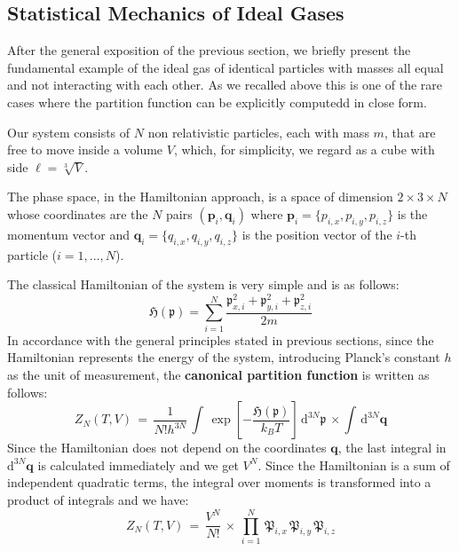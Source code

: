 \documentclass[10pt,a4paper]{article}
\begin{document}
\subsection{Statistical Mechanics of Ideal Gases}
\label{msidgas} After the general exposition of the previous section, we briefly present  the fundamental example
of the ideal gas of identical particles with masses all equal and not interacting with each other.  As we recalled above
this is one of the rare cases where the partition function can be explicitly computedd in close form.
\par
Our system consists of $N$  non relativistic particles,
each with mass $\mathit{m}$, that are free to move inside a
volume $V$, which, for simplicity,  we regard as a cube  with
side $\ell = \sqrt[3]{V}$.
\par The phase space, in the Hamiltonian approach, is a space of dimension $2\times 3 \times N$ whose coordinates are the
$N$ pairs $(\mathbf{p}_i,\mathbf{q}_i)$ where
$\mathbf{p}_i=\{p_{i,x},p_{i,y},p_{i,z}\}$ is the momentum vector
and $\mathbf{q}_i=\{q_{i,x},q_{i,y},q_{i,z}\}$ is the position vector
of the $i$-th particle ($i=1,\dots, N$).
\par
The classical Hamiltonian of the system is very simple and is as follows:
\begin{equation}\label{idgasham}
    \mathfrak{H}(\boldsymbol{\mathfrak{p}})= \sum _{i=1}^N
   \frac{\mathfrak{p}_{x,i}^2+\mathfrak{p}_{y,i}^2+\mathfrak{p}_{z,i}^2}{2 \mathit{m}}
\end{equation}
In accordance with the general principles stated in previous sections, since the Hamiltonian represents the
energy of the system, introducing Planck's constant $h$ as the unit of measurement, the \textbf{canonical partition
function} is written as follows:
\begin{equation}\label{idgaspartfundef}
    Z_N(T,V) \, = \, \frac{1}{N!h^{3N}} \, \int \,
    \exp\left [- \frac{\mathfrak{H}(\boldsymbol{\mathfrak{p}})}{k_B T}\right]
    \,\mathrm{d}^{3N} \boldsymbol{\mathfrak{p}}\, \times \int \,\mathrm{d}^{3N} \mathbf{q}
\end{equation}
Since the Hamiltonian does not depend on the coordinates $\mathbf{q}$,
the last integral in $\mathrm{d}^{3N} \mathbf{q}$ is calculated immediately
and we get $V^N$.  Since the Hamiltonian is a sum of independent quadratic terms, the integral over moments is
transformed into a product of integrals and we have:
\begin{equation}\label{idgaspartfundevel1}
     Z_N(T,V) \, = \, \frac{V^N}{N!} \, \times \,\prod_{i=1}^N  \,
     \mathfrak{P}_{i,x} \, \mathfrak{P}_{i,y} \, \mathfrak{P}_{i,z}
\end{equation}
\end{document}
